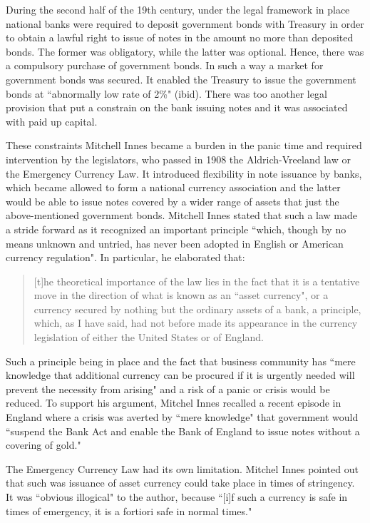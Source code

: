 During the second half of the 19th century, under the legal framework in place national banks were required to deposit government bonds with Treasury in order to obtain a lawful right to issue of notes in the amount no more than deposited bonds. The former was obligatory, while the latter was optional. Hence, there was a compulsory purchase of government bonds. In such a way a market for government bonds was secured. It enabled the Treasury to issue the government bonds at ``abnormally low rate of 2\%" (ibid). There was too another legal provision that put a constrain on the bank issuing notes and it was associated with paid up capital.

These constraints Mitchell Innes became a burden in the panic time and required intervention by the legislators, who passed in 1908 the Aldrich-Vreeland law or the Emergency Currency Law. It introduced flexibility in note issuance by banks, which became allowed to form a national currency association and the latter would be able to issue notes covered by a wider range of assets that just the above-mentioned government bonds. Mitchell Innes stated that such a law made a stride forward as it recognized an important principle ``which, though by no means unknown and untried, has never been adopted in English or American currency regulation". In particular, he elaborated that:

\begin{quote}
[t]he theoretical importance of the law lies in the fact that it is a tentative move in the direction of what is known as an ``asset currency", or a currency secured by nothing but the ordinary assets of a bank, a principle, which, as I have said, had not before made its appearance in the currency legislation of either the United States or of England.~\citep[pp.~1-2]{innes1910}
\end{quote}

Such a principle being in place and the fact that business community has ``mere knowledge that additional currency can be procured if it is urgently needed will prevent the necessity from arising" and a risk of a panic or crisis would be reduced. To support his argument, Mitchel Innes recalled a recent episode in England where a crisis was averted by ``mere knowledge" that government would ``suspend the Bank Act and enable the Bank of England to issue notes without a covering of gold."

The Emergency Currency Law had its own limitation. Mitchel Innes pointed out that such was issuance of asset currency could take place in times of stringency. It was ``obvious illogical" to the author, because ``[i]f such a currency is safe in times of emergency, it is a fortiori safe in normal times."

